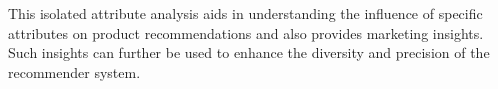This isolated attribute analysis aids in understanding the influence of specific
attributes on product recommendations and also provides marketing insights. Such
insights can further be used to enhance the diversity and precision of the
recommender system.






